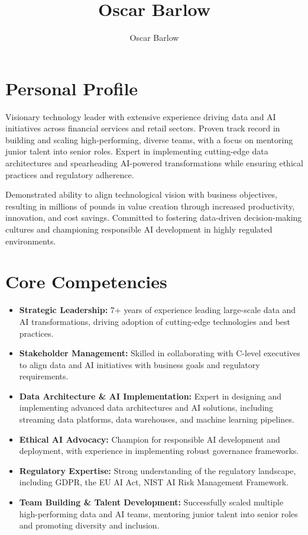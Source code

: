\documentclass[a4paper]{scrartcl}
\author{Oscar Barlow}
\title{Oscar Barlow}
\date{}
\begin{document}
\maketitle

\section*{Personal Profile}
 { %
  \setlength{\parskip}{6pt plus 2pt minus 1pt}
  Visionary technology leader with extensive experience driving data and AI initiatives across financial services and retail sectors. Proven track record in building and scaling high-performing, diverse teams, with a focus on mentoring junior talent into senior roles. Expert in implementing cutting-edge data architectures and spearheading AI-powered transformations while ensuring ethical practices and regulatory adherence. 
  
  Demonstrated ability to align technological vision with business objectives, resulting in millions of pounds in value creation through increased productivity, innovation, and cost savings. Committed to fostering data-driven decision-making cultures and championing responsible AI development in highly regulated environments.
 } %

\section*{Core Competencies}
\begin{itemize}
	\item \textbf{Strategic Leadership:} 7+ years of experience leading large-scale data and AI transformations, driving adoption of cutting-edge technologies and best practices.
	\item \textbf{Stakeholder Management:} Skilled in collaborating with C-level executives to align data and AI initiatives with business goals and regulatory requirements.
	\item \textbf{Data Architecture \& AI Implementation:} Expert in designing and implementing advanced data architectures and AI solutions, including streaming data platforms, data warehouses, and machine learning pipelines.
	\item \textbf{Ethical AI Advocacy:} Champion for responsible AI development and deployment, with experience in implementing robust governance frameworks.
	\item \textbf{Regulatory Expertise:} Strong understanding of the regulatory landscape, including GDPR, the EU AI Act, NIST AI Risk Management Framework.
	\item \textbf{Team Building \& Talent Development:} Successfully scaled multiple high-performing data and AI teams, mentoring junior talent into senior roles and promoting diversity and inclusion.
\end{itemize}
\end{document}
